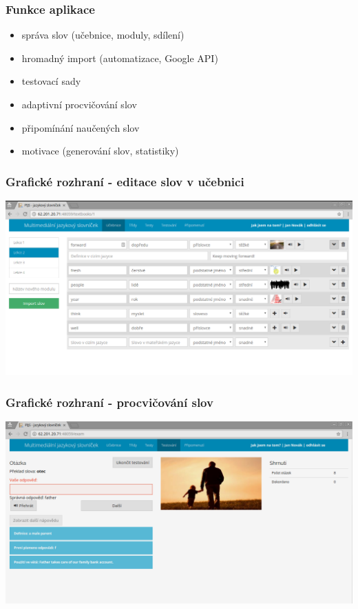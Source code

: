 \begin{frame}[t]
    \frametitle{Funkce aplikace}
    \begin{itemize}[<+->]
        \item správa slov (učebnice, moduly, sdílení)
        \item hromadný import (automatizace, Google API)
        \item testovací sady
        \item adaptivní procvičování slov
        \item připomínání naučených slov
        \item motivace (generování slov, statistiky)
    \end{itemize}
\end{frame}

\begin{frame}[t]
    \frametitle{Grafické rozhraní - editace slov v učebnici}
    \begin{center}
        \includegraphics[width=\textwidth]{./img/gui-textbook-editor.png}\\
    \end{center}
\end{frame}

\begin{frame}[t]
    \frametitle{Grafické rozhraní - procvičování slov}
    \begin{center}
        \includegraphics[width=\textwidth]{./img/gui-testing.png}\\
    \end{center}
\end{frame}

